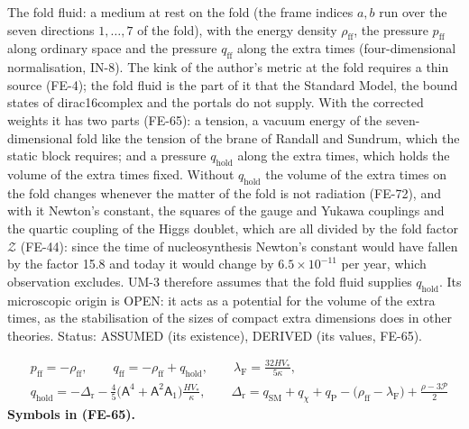 \documentclass[
  10pt,
]{article}
\begin{document}
The fold fluid: a medium at rest on the fold (the frame indices \(a, b\)
run over the seven directions \(1, \dots, 7\) of the fold), with the
energy density \(\rho_{\mathrm{ff}}\), the pressure \(p_{\mathrm{ff}}\)
along ordinary space and the pressure \(q_{\mathrm{ff}}\) along the
extra times (four-dimensional normalisation, IN-8). The kink of the
author's metric at the fold requires a thin source (FE-4); the fold
fluid is the part of it that the Standard Model, the bound states of
dirac16complex and the portals do not supply. With the corrected weights
it has two parts (FE-65): a tension, a vacuum energy of the
seven-dimensional fold like the tension of the brane of Randall and
Sundrum, which the static block requires; and a pressure
\(q_{\mathrm{hold}}\) along the extra times, which holds the volume of
the extra times fixed. Without \(q_{\mathrm{hold}}\) the volume of the
extra times on the fold changes whenever the matter of the fold is not
radiation (FE-72), and with it Newton's constant, the squares of the
gauge and Yukawa couplings and the quartic coupling of the Higgs
doublet, which are all divided by the fold factor \(\mathcal{Z}\)
(FE-44): since the time of nucleosynthesis Newton's constant would have
fallen by the factor 15.8 and today it would change by
\(6.5\times10^{-11}\) per year, which observation excludes. UM-3
therefore assumes that the fold fluid supplies \(q_{\mathrm{hold}}\).
Its microscopic origin is OPEN: it acts as a potential for the volume of
the extra times, as the stabilisation of the sizes of compact extra
dimensions does in other theories. Status: ASSUMED (its existence),
DERIVED (its values, FE-65).

\[
\begin{aligned}
&p_{\mathrm{ff}} = -\rho_{\mathrm{ff}},\qquad q_{\mathrm{ff}} = -\rho_{\mathrm{ff}} + q_{\mathrm{hold}},\qquad
 \lambda_{\mathrm{F}} = \frac{32HV_*}{5\kappa},\\
&q_{\mathrm{hold}} = -\Delta_{\mathrm{r}} - \frac45\big(\mathsf{A}^4 + \mathsf{A}^2\mathsf{A}_1\big)\frac{HV_*}{\kappa},\qquad
 \Delta_{\mathrm{r}} = q_{\mathrm{SM}} + q_\chi + q_{\mathrm{P}} - \big(\rho_{\mathrm{ff}} - \lambda_{\mathrm{F}}\big) + \frac{\rho - 3\mathcal{P}}{2}
\end{aligned} \tag{FE-65}
\] \textbf{Symbols in (FE-65).}
\end{document}
